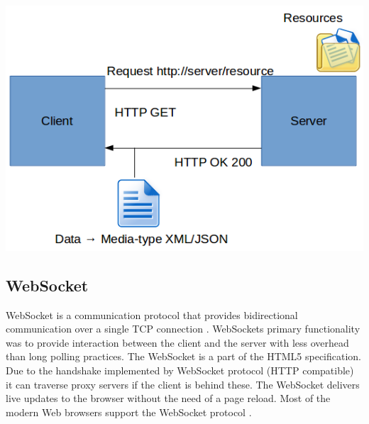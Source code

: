 \bigskip
\includegraphics[scale=0.5]{gfx/REST} 
\bigskip

\subsection{WebSocket}
\label{subsec:websocket}
WebSocket is a communication protocol that provides bidirectional communication over a single TCP connection \citep{rfc6455}. WebSockets primary functionality was to provide interaction between the client and the server with less overhead than long polling practices. The WebSocket is a part of the HTML5 specification. Due to the handshake implemented by WebSocket protocol (HTTP compatible) it can traverse proxy servers if the client is behind these. The WebSocket delivers live updates to the browser without the need of a page reload. Most of the modern Web browsers support the WebSocket protocol \citep{wssupport}.

